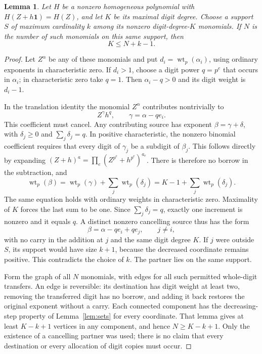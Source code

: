 \documentclass[11pt]{article}
\newtheorem{lemma}[theorem]{Lemma}
\newcommand{\wt}{\operatorname{wt}}
\begin{document}
\begin{lemma}\label{lem:transfer}
Let $H$ be a nonzero homogeneous polynomial with
$H(Z+h\mathbf1)=H(Z)$, and let $K$ be its maximal digit degree.
Choose a support $S$ of maximum cardinality $k$ among its nonzero
digit-degree-$K$ monomials. If $N$ is the number of such monomials on
this same support, then
\[
 K\le N+k-1.
\]
\end{lemma}
\begin{proof}
Let $Z^\alpha$ be any of these monomials and put
$d_i=\wt_p(\alpha_i)$, using ordinary exponents in characteristic zero.
If $d_i>1$, choose a digit power $q=p^e$ that occurs in $\alpha_i$;
in characteristic zero take $q=1$. Then $\alpha_i-q>0$ and its digit
weight is $d_i-1$.

In the translation identity the monomial $Z^\alpha$ contributes
nontrivially to
\[
 Z^\gamma h^q,\qquad \gamma=\alpha-qe_i.
\]
This coefficient must cancel. Any contributing source has exponent
$\beta=\gamma+\delta$, with $\delta_j\ge0$ and
$\sum_j\delta_j=q$. In positive characteristic, the nonzero binomial
coefficient requires that every digit of $\gamma_j$ be a subdigit of
$\beta_j$. This follows directly by expanding
$(Z+h)^a=\prod_e(Z^{p^e}+h^{p^e})^{a_e}$.
There is therefore no borrow in the subtraction, and
\begin{equation}\label{eq:weight}
 \wt_p(\beta)=\wt_p(\gamma)+\sum_j\wt_p(\delta_j)
              =K-1+\sum_j\wt_p(\delta_j).
\end{equation}
The same equation holds with ordinary weights in characteristic zero.
Maximality of $K$ forces the last sum to be one. Since
$\sum_j\delta_j=q$, exactly one increment is nonzero and it equals
$q$. A distinct nonzero cancelling source thus has the form
\begin{equation}\label{eq:transfer}
 \beta=\alpha-qe_i+qe_j,\qquad j\ne i,
\end{equation}
with no carry in the addition at $j$ and the same digit degree $K$.
If $j$ were outside $S$, its support would have size $k+1$, because
the decreased coordinate remains positive. This contradicts the choice
of $k$. The partner lies on the same support.

Form the graph of all $N$ monomials, with edges for all such permitted
whole-digit transfers. An edge is reversible: its destination has digit
weight at least two, removing the transferred digit has no borrow, and
adding it back restores the original exponent without a carry.
Each connected component has the decreasing-step property of
Lemma~\ref{lem:sets} for every coordinate. That lemma gives at least
$K-k+1$ vertices in any component, and hence $N\ge K-k+1$.
Only the existence of a cancelling partner was used; there is no claim
that every destination or every allocation of digit copies must occur.
\end{proof}
\end{document}
